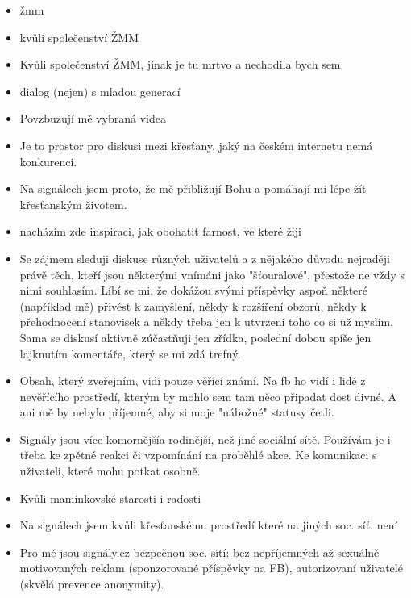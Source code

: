 \documentclass[12pt, a4paper, twoside]{article}
\begin{document}
\begin{itemize}
\item žmm

\item kvůli společenství ŽMM

\item Kvůli společenství ŽMM, jinak je tu mrtvo a nechodila bych sem

\item dialog (nejen) s mladou generací

\item Povzbuzují mě vybraná videa

\item Je to prostor pro diskusi mezi křesťany, jaký na českém internetu nemá konkurenci.

\item Na signálech jsem proto, že mě přibližují Bohu a pomáhají mi lépe žít křesťanským životem.

\item nacházím zde inspiraci, jak obohatit farnost, ve které žiji

\item Se zájmem sleduji diskuse různých uživatelů a z nějakého důvodu nejraději právě těch, kteří jsou některými vnímáni jako "šťouralové", přestože ne vždy s nimi souhlasím. Líbí se mi, že dokážou svými příspěvky aspoň některé (například mě) přivést k zamyšlení, někdy k rozšíření obzorů, někdy k přehodnocení stanovisek a někdy třeba jen k utvrzení toho co si už myslím. Sama se diskusí aktivně zúčastňuji jen zřídka, poslední dobou spíše jen lajknutím komentáře, který se mi zdá trefný.

\item Obsah, který zveřejním, vidí pouze věřící známí. Na fb ho vidí i lidé z nevěřícího prostředí, kterým by mohlo sem tam něco připadat dost divné. A ani mě by nebylo příjemné, aby si moje "nábožné" statusy četli.

\item Signály jsou více komornějšía  rodinější, než jiné sociální sítě. Používám je i třeba ke zpětné reakci či vzpomínání na proběhlé akce. Ke komunikaci s uživateli, které mohu potkat osobně.

\item Kvůli maminkovské starosti i radosti

\item Na signálech jsem kvůli křesťanskému prostředí které na jiných soc. síť. není

\item Pro mě jsou signály.cz bezpečnou soc. sítí: bez nepříjemných až sexuálně motivovaných reklam (sponzorované příspěvky na FB), autorizovaní uživatelé (skvělá prevence anonymity).


\end{itemize}
\end{document}
